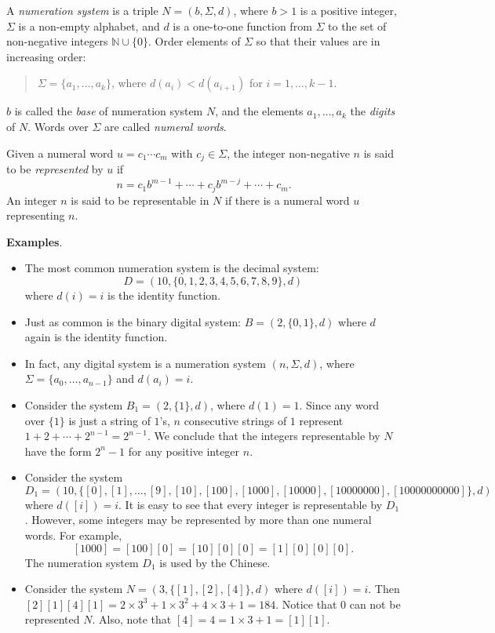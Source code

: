 \documentclass[12pt]{article}
\begin{document}
A \emph{numeration system} is a triple $N=(b,\Sigma,d)$, where $b>1$ is a positive integer, $\Sigma$ is a non-empty alphabet, and $d$ is a one-to-one function from $\Sigma$ to the set of non-negative integers $\mathbb{N}\cup \lbrace 0\rbrace$.  Order elements of $\Sigma$ so that their values are in increasing order:
\begin{quote}
$\Sigma=\lbrace a_1,\ldots, a_k\rbrace$, where $d(a_i)< d(a_{i+1})$ for $i=1,\ldots, k-1$.
\end{quote}
$b$ is called the \emph{base} of numeration system $N$, and the elements $a_1,\ldots,a_k$ the \emph{digits} of $N$.  Words over $\Sigma$ are called \emph{numeral words}.

Given a numeral word $u=c_1\cdots c_m$ with $c_j\in \Sigma$, the integer non-negative $n$ is said to be \emph{represented} by $u$ if
$$n= c_1 b^{m-1} + \cdots + c_j b^{m-j} + \cdots + c_m.$$
An integer $n$ is said to be representable in $N$ if there is a numeral word $u$ representing $n$.

\textbf{Examples}.
\begin{itemize}
\item The most common numeration system is the decimal system: $$D=(10,\lbrace 0,1,2,3,4,5,6,7,8,9\rbrace, d)$$ where $d(i)=i$ is the identity function.
\item Just as common is the binary digital system: $B=(2,\lbrace 0,1\rbrace,d)$ where $d$ again is the identity function.
\item In fact, any digital system is a numeration system $(n,\Sigma,d)$, where $\Sigma=\lbrace a_0,\ldots,a_{n-1}\rbrace$ and $d(a_i)=i$.
\item Consider the system $B_1=(2,\lbrace 1\rbrace,d)$, where $d(1)=1$.  Since any word over $\lbrace 1\rbrace$ is just a string of $1$'s, $n$ consecutive strings of $1$ represent $1+2+\cdots +2^{n-1} = 2^{n-1}$.  We conclude that the integers representable by $N$ have the form $2^n-1$ for any positive integer $n$.
\item Consider the system $$D_1=(10,\lbrace [0],[1],\ldots,[9],[10],[100],[1000],[10000],[10000000],[10000000000]\rbrace,d)$$ where $d([i])=i$.  It is easy to see that every integer is representable by $D_1$.  However, some integers may be represented by more than one numeral words.  For example, $$[1000]=[100][0]=[10][0][0]=[1][0][0][0].$$
The numeration system $D_1$ is used by the Chinese.
\item Consider the system $N=(3,\lbrace [1],[2],[4]\rbrace,d)$ where $d([i])=i$.  Then $[2][1][4][1] = 2\times 3^3 + 1\times 3^2 + 4\times 3 + 1 =  184$.  Notice that $0$ can not be represented $N$.  Also, note that $[4]=4=1\times 3+1 = [1][1]$.
\end{itemize}
\end{document}
